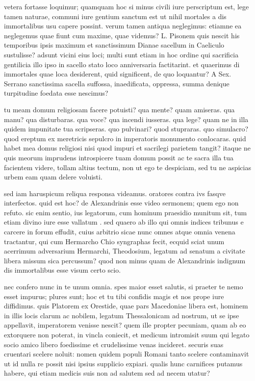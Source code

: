  vetera fortasse loquimur; quamquam hoc si minus civili iure perscriptum est, lege tamen naturae, communi iure gentium sanctum est ut nihil mortales a dis immortalibus usu capere possint. verum tamen antiqua neglegimus: etiamne ea neglegemus quae fiunt cum maxime, quae videmus? L. Pisonem quis nescit his temporibus ipsis maximum et sanctissimum Dianae sacellum in Caeliculo sustulisse? adsunt vicini eius loci; multi sunt etiam in hoc ordine qui sacrificia gentilicia illo ipso in sacello stato loco anniversaria factitarint. et quaerimus di immortales quae loca desiderent, quid significent, de quo loquantur? A Sex. Serrano sanctissima sacella suffossa, inaedificata, oppressa, summa denique turpitudine foedata esse nescimus?

 tu meam domum religiosam facere potuisti? qua mente? quam amiseras. qua manu? qua disturbaras. qua voce? qua incendi iusseras. qua lege? quam ne in illa quidem impunitate tua scripseras. quo pulvinari? quod stupraras. quo simulacro? quod ereptum ex meretricis sepulcro in imperatoris monumento conlocaras. quid habet mea domus religiosi nisi quod impuri et sacrilegi parietem tangit? itaque ne quis meorum imprudens introspicere tuam domum possit ac te sacra illa tua facientem videre, tollam altius tectum, non ut ego te despiciam, sed tu ne aspicias urbem eam quam delere voluisti.

 sed iam haruspicum reliqua responsa videamus. oratores contra ivs fasqve interfectos. quid est hoc? de Alexandrinis esse video sermonem; quem ego non refuto. sic enim sentio, ius legatorum, cum hominum praesidio munitum sit, tum etiam divino iure esse vallatum . sed quaero ab illo qui omnis indices tribunus e carcere in forum effudit, cuius arbitrio sicae nunc omnes atque omnia venena tractantur, qui cum Hermarcho Chio syngraphas fecit, ecquid sciat unum acerrimum adversarium Hermarchi, Theodosium, legatum ad senatum a civitate libera missum sica percussum? quod non minus quam de Alexandrinis indignum dis immortalibus esse visum certo scio.

 nec confero nunc in te unum omnia. spes maior esset salutis, si praeter te nemo esset impurus; plures sunt; hoc et tu tibi confidis magis et nos prope iure diffidimus. quis Platorem ex Orestide, quae pars Macedoniae libera est, hominem in illis locis clarum ac nobilem, legatum Thessalonicam ad nostrum, ut se ipse appellavit, imperatorem venisse nescit? quem ille propter pecuniam, quam ab eo extorquere non poterat, in vincla coniecit, et medicum intromisit suum qui legato socio amico libero foedissime et crudelissime venas incideret. securis suas cruentari scelere noluit: nomen quidem populi Romani tanto scelere contaminavit ut id nulla re possit nisi ipsius supplicio expiari. qualis hunc carnifices putamus habere, qui etiam medicis suis non ad salutem sed ad necem utatur?

